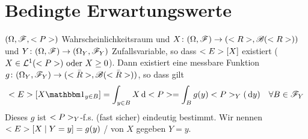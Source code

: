 \section{Bedingte Erwartungswerte}
\begin{proposition}
	$(\O, \F, \P)$ Wahrscheinlichkeitsraum und $X\colon (\O,\F) \to (\R, \borel(\R))$ und $Y\colon (\O,\F) \to (\O_Y, \F_Y)$ Zufallsvariable, so dass $\E[X]$ existiert ($X \in \Ln{1}(\P) \oder X \ge 0$). Dann existiert eine messbare Funktion $g\colon (\O_Y, \F_Y) \to (\bar{\R}, \borel(\bar{\R}))$, so dass gilt
	\begin{align*}
		\E[X\indi_{y\in B}]=\int_{y \in B} X \d \P = \int_B g(y) \P_Y(\d y) \quad \forall B \in \F_Y
	\end{align*}
	Dieses $g$ ist $\P_Y$-f.s. (fast sicher) eindeutig bestimmt. Wir nennen $\E[X \mid Y = y] = g(y)$ / von $X$ gegeben $Y=y$.
\end{proposition}
